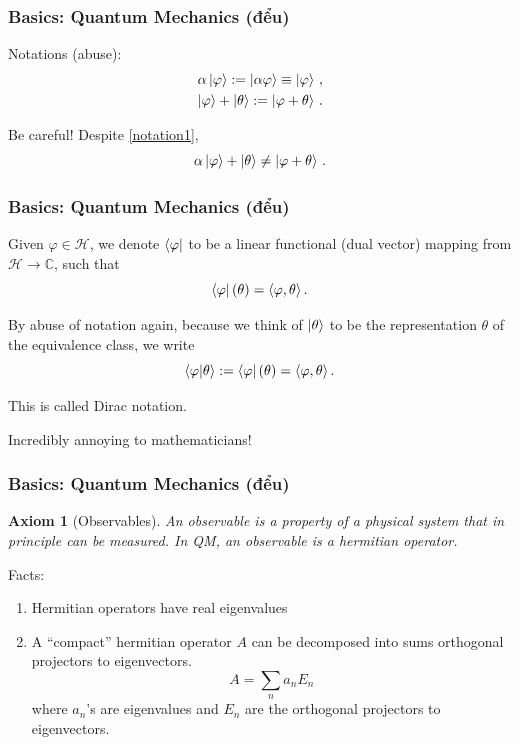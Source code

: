 \documentclass[12pt, aspectratio=169]{beamer}
\newtheorem{axiom}{Axiom}
\begin{document}
\begin{frame}
\frametitle{Basics: Quantum Mechanics (đểu)}
    Notations (abuse): 
    \begin{gather}
        \alpha \ket{\varphi} := \ket{\alpha \varphi}\equiv \ket{\varphi} \,, \label{notation1} \\
    \ket{\varphi} + \ket{\theta} :=  \ket{\varphi + \theta}\,.
    \end{gather}


    Be careful! Despite \eqref{notation1}, 
    \begin{equation*}
        \alpha\ket{\varphi} + \ket{\theta} \not= \ket{\varphi + \theta}\,.
    \end{equation*}
\end{frame}


\begin{frame}
\frametitle{Basics: Quantum Mechanics (đểu)}
    Given $\varphi \in \mathcal{H}$, we denote $\bra{\varphi}$ to be a linear 
    functional (dual vector) mapping from $\mathcal{H} \to \mathbb{C}$, such that
    \begin{equation*}
    \bra{\varphi} (\theta) = \langle \varphi, \theta \rangle \,.
    \end{equation*}

    By abuse of notation again, because we think of $\ket{\theta}$
    to be the representation $\theta$ of the equivalence class,
    we write
    \begin{equation*}
        \braket{ \varphi}{ \theta } := \bra{\varphi}(\theta)=  \langle \varphi, \theta \rangle \,.
    \end{equation*}
    
    This is called Dirac notation.

    \pause
    Incredibly annoying to mathematicians!
\end{frame}


\begin{frame}
\frametitle{Basics: Quantum Mechanics (đểu)}
\begin{axiom}[Observables]
    An observable is a property of a physical system that in principle can be measured.
    In QM, an observable is a hermitian operator.
\end{axiom}
    Facts:
    \begin{enumerate}
        \item Hermitian operators have real eigenvalues
        \item A ``compact'' hermitian operator $A$ can be decomposed into sums orthogonal projectors to eigenvectors.
   \begin{equation*}
       A =  \sum_n a_n E_n
   \end{equation*}
   where
   $a_n$'s are eigenvalues and $E_n$ are the orthogonal projectors to eigenvectors.
    \end{enumerate}
\end{frame}
\end{document}

